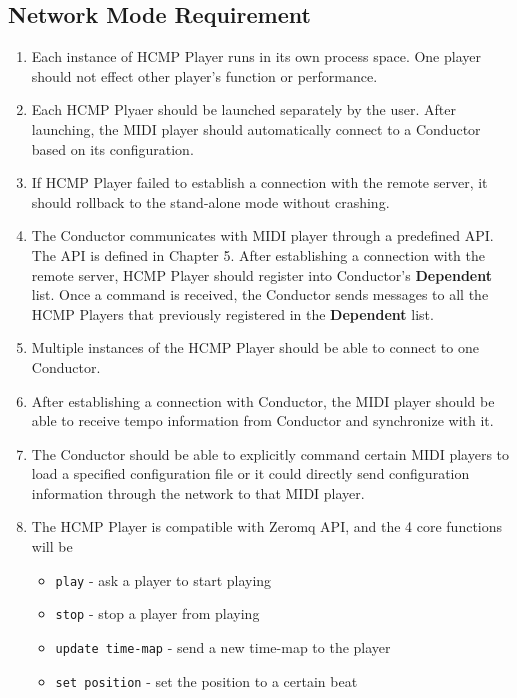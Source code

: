 \subsection{Network Mode Requirement}
\begin{enumerate}
  \item Each instance of HCMP Player runs in its own process space. One player 
        should not effect other player's function or performance. 
        
  \item Each HCMP Plyaer should be launched separately by the user. After 
        launching, the MIDI player should automatically connect to a Conductor 
        based on its configuration.

  \item If HCMP Player failed to establish a connection with the remote server, 
        it should rollback to the stand-alone mode without crashing.

  \item The Conductor communicates with MIDI player through a predefined API. 
        The API is defined in Chapter 5. After establishing a connection with 
        the remote server, HCMP Player should register into Conductor's 
        {\bf Dependent} list. Once a command is received, the Conductor sends 
        messages to all the HCMP Players that previously registered in the 
        {\bf Dependent} list. 

  \item Multiple instances of the HCMP Player should be able to connect to one Conductor. 
  \item After establishing a connection with Conductor, the MIDI player 
        should be able to receive tempo information from Conductor and 
        synchronize with it.     
  \item The Conductor should be able to explicitly command certain MIDI players to 
        load a specified configuration file or it could directly 
        send configuration information through the network to that MIDI player.
  \item 
    The HCMP Player is compatible with Zeromq\cite{zeromq} API, 
    and the 4 core functions will be
    \begin{itemize}
      \item \texttt{play} - ask a player to start playing 
      \item \texttt{stop} - stop a player from playing 
      \item \texttt{update time-map} - send a new time-map to the player 
      \item \texttt{set position} - set the position to a certain beat 
    \end{itemize}
\end{enumerate}

